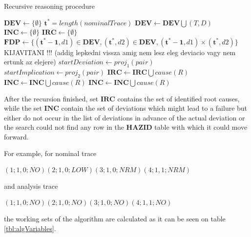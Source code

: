 \documentclass[conference]{IEEEtran}
\begin{document}
\begin{algorithm*}
\caption{Recursive reasoning procedure}
\label{alg:main}
\begin{algorithmic}[1]
\State $\mathbf{DEV} \leftarrow \{ \emptyset \}$
\State $\mathbf{t^*}=length(nominalTrace)$
\State $\mathbf{DEV} \leftarrow \mathbf{DEV} \bigcup (T,D)$
\EndFor
\EndFor
\State $\mathbf{INC} \leftarrow \{ \emptyset \}$
\State $\mathbf{IRC} \leftarrow \{ \emptyset \}$
\State $\mathbf{FDP} \leftarrow \{(\mathbf{t^*-1},d1) \in \mathbf{DEV},(\mathbf{t^*},d2) \in \mathbf{DEV}, (\mathbf{t^*-1},d1) \times (\mathbf{t^*},d2) \}$ KIJAVITANI !!! (addig lepkedni vissza amig nem lesz eleg deviacio vagy nem ertunk az elejere)
  \State $startDeviation \leftarrow proj_1(pair)$
  \State $startImplication \leftarrow proj_2(pair)$
  \State {}
\EndFor
{}
     \State $\mathbf{IRC} \leftarrow \mathbf{IRC} \bigcup cause(R)$
     \State \Return
   \Else
          	\State {}
     \Else
      \State $\mathbf{INC} \leftarrow \mathbf{INC} \bigcup cause(R)$
      \State \Return
     \EndIf
   \EndIf
 \EndFor
\Else
\State $\mathbf{INC} \leftarrow \mathbf{INC} \bigcup cause(R)$
      \State \Return
\EndIf
\EndProcedure
\end{algorithmic}
\end{algorithm*}

After the recursion finished, set $\mathbf{IRC}$ contains the set of identified root causes, while the set
$\mathbf{INC}$ contain the set of deviations which might lead to a failure but either do not occur in the list
of deviations in advance of the actual deviation or the search could not find any row in the $\mathbf{HAZID}$ table with which it could move forward.

For example, for nominal trace 

$(1;1,0;NO) (2;1,0;LOW) (3;1,0;NRM) (4;1,1;NRM)$

and analysis trace 

$(1;1,0;NO) (2;1,0;NO) (3;1,0;NO) (4;1,1;NO)$

the working sets of the algorithm are calculated as it can be seen on table \ref{tbl:algVariables}.
\end{document}
